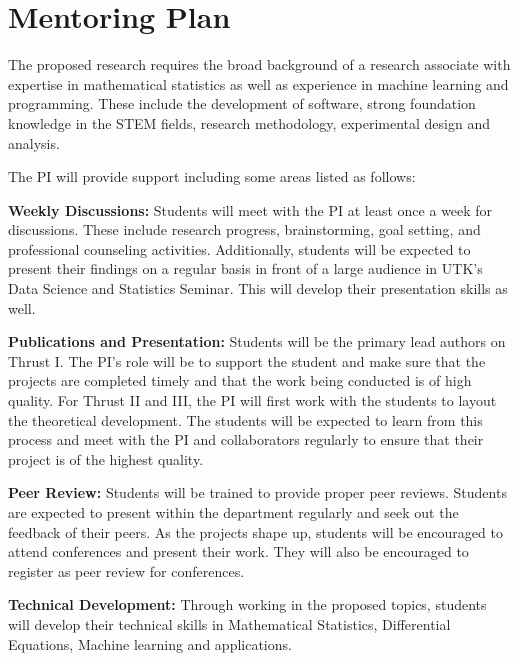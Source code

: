 \section*{Mentoring Plan}

The proposed research requires the broad background of a research associate with expertise in mathematical statistics as well as experience in machine learning and programming. These include the development of software, strong foundation knowledge in the STEM fields, research methodology, experimental design and analysis. 

The PI will provide support including some areas listed as follows:

\noindent\textbf{Weekly Discussions: } Students will meet with the PI at least once a week for discussions. These include research progress, brainstorming, goal setting, and professional counseling activities. Additionally, students will be expected to present their findings on a regular basis in front of a large audience in UTK's Data Science and Statistics Seminar. This will develop their presentation skills as well. 

\noindent\textbf{Publications and Presentation: } Students will be the primary lead authors on Thrust I. The PI's role will be to support the student and make sure that the projects are completed timely and that the work being conducted is of high quality. For Thrust II and III, the PI will first work with the students to layout the theoretical development. The students will be expected to learn from this process and meet with the PI and collaborators regularly to ensure that their project is of the highest quality.

\noindent\textbf{Peer Review: } Students will be trained to provide proper peer reviews. Students are expected to present within the department regularly and seek out the feedback of their peers. As the projects shape up, students will be encouraged to attend conferences and present their work. They will also be encouraged to register as peer review for conferences. 

\noindent\textbf{Technical Development: } Through working in the proposed topics, students will develop their technical skills in Mathematical Statistics, Differential Equations, Machine learning and applications. 

